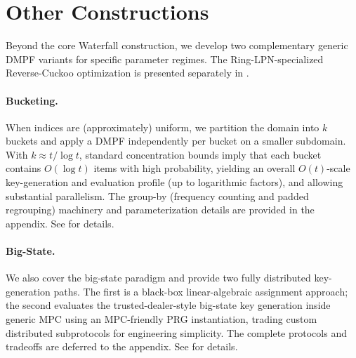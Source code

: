 \section{Other Constructions}



Beyond the core Waterfall construction, we develop two complementary generic
DMPF variants for specific parameter regimes.  The Ring-LPN-specialized
Reverse-Cuckoo optimization is presented separately in
.

\paragraph{Bucketing.}
When indices are (approximately) uniform, we partition the domain into $k$ buckets and apply a
DMPF independently per bucket on a smaller subdomain. With $k \approx t/\log t$, standard
concentration bounds imply that each bucket contains $O(\log t)$ items with high probability,
yielding an overall $O(t)$-scale key-generation and evaluation profile (up to logarithmic factors),
and allowing substantial parallelism. The group-by (frequency counting and padded regrouping)
machinery and parameterization details are provided in the appendix. See  for details.

\paragraph{Big-State.}
We also cover the big-state paradigm and provide two fully distributed key-generation paths.
The first is a black-box linear-algebraic assignment approach;
the second evaluates the trusted-dealer-style big-state key generation inside generic MPC using
an MPC-friendly PRG instantiation, trading custom distributed subprotocols for engineering
simplicity. The complete protocols and tradeoffs are deferred to the appendix. See  for details.
